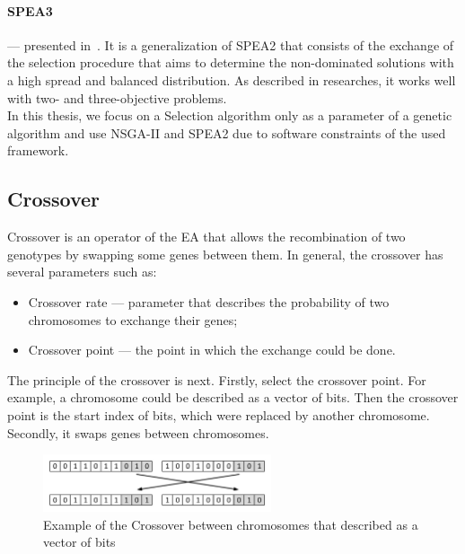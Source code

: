 \paragraph{SPEA3} — presented in~\cite{rudzinski15}. It is a generalization of SPEA2 that consists of the exchange of the selection procedure that aims to determine the non-dominated solutions with a high spread and balanced distribution. As described in researches, it works well with two- and three-objective problems. \\

In this thesis, we focus on a Selection algorithm only as a parameter of a genetic algorithm and use NSGA-II and SPEA2 due to software constraints of the used framework. 

\subsection{Crossover}\label{sec:GeneticAlgorithmCrossover}

Crossover is an operator of the EA that allows the recombination of two genotypes by swapping some genes between them.
In general, the crossover has several parameters such as:

\begin{itemize}
	\item Crossover rate — parameter that describes the probability of two chromosomes to exchange their genes;
	\item Crossover point — the point in which the exchange could be done.
\end{itemize}

The principle of the crossover is next.
Firstly, select the crossover point. For example, a chromosome could be described as a vector of bits. Then the crossover point is the start index of bits, which were replaced by another chromosome.
Secondly, it swaps genes between chromosomes.

\begin{figure}
	\centering
	\includegraphics[width=0.6\textwidth]{images/crossoverVector.pdf}
	\caption[Example of the Crossover]{Example of the Crossover between chromosomes that described as a vector of bits}
	\label{fig:crossoverVector}
\end{figure}

